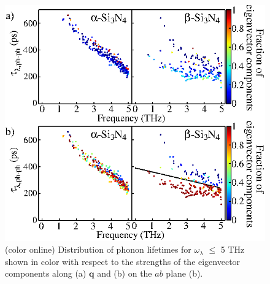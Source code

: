 \documentclass[twocolumn,amsmath,amssymb,a4paper,prb,superscriptaddress,floatfix]{revtex4-1}
\begin{document}
\begin{figure}[ht]
	 \centering
	   \includegraphics[width=\linewidth]{figure_analyze_gamma3_m1010_nolog.eps} \caption{(color
		   	  online) Distribution of phonon lifetimes for $\omega_\lambda$ $\leq$ 5 THz
	  		  shown in color with respect to the strengths of the eigenvector
	  		  components along (a) $\mathbf q$ 
		  	  and (b) on the $ab$ plane (b).} \label{fig:Fig7_338} 
	   \centering
\end{figure}
\end{document}
